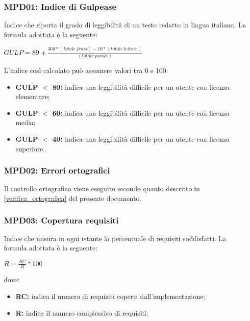     \subsubsection{MPD01: Indice di Gulpease}
    Indice che riporta il grado di leggibilità di un testo redatto in lingua italiana.
    La formula adottata è la seguente: 
    \begin{center}
        $GULP = 89 + \displaystyle \frac{300*(totale\ frasi)-10*(totale\ lettere)}{(totale\ parole)}$
    \end{center}
    L’indice così calcolato può assumere valori tra 0 e 100:
    \begin{itemize}
        \item \textbf{GULP $<$ 80:} indica una leggibilità difficile per un utente con licenza elementare;
        \item \textbf{GULP $<$ 60:} indica una leggibilità difficile per un utente con licenza media;
        \item \textbf{GULP $<$ 40:} indica una leggibilità difficile per un utente con licenza superiore.
    \end{itemize}

    \subsubsection{MPD02: Errori ortografici}
    Il controllo ortografico viene eseguito secondo quanto descritto in \ref{verifica_ortografica} del presente documento.

    \subsubsection{MPD03: Copertura requisiti}
    Indice che misura in ogni istante la percentuale di requisiti soddisfatti.
    La formula adottata è la seguente:
    \begin{center}
        $R = \displaystyle \frac{RC}{R}*100$
    \end{center}
    dove:
    \begin{itemize}
        \item \textbf{RC:} indica il numero di requisiti coperti dall'implementazione;
        \item \textbf{R:} indica il numero complessivo di requisiti.
    \end{itemize}